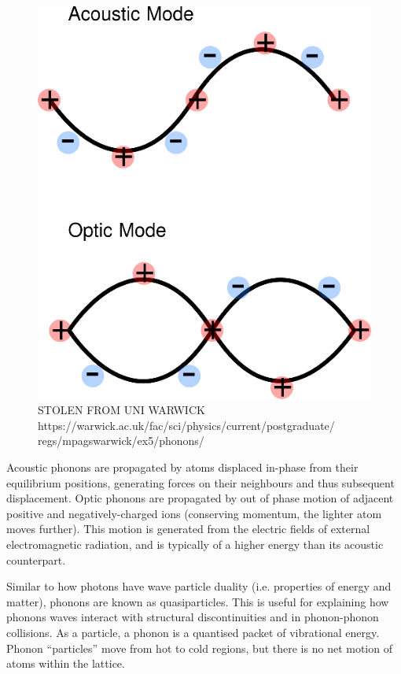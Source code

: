 \begin{figure}[h]
  \includegraphics[width=\linewidth]{Figures/phonon-warwick-acoustic-optic-diagram.png}
  \caption[PHONON TYPE DIAGRAM]{STOLEN FROM UNI WARWICK https://warwick.ac.uk/fac/sci/physics/current/postgraduate/
  regs/mpagswarwick/ex5/phonons/}
  \label{fig:phonon_diagram}
\end{figure}

Acoustic phonons are propagated by atoms displaced in-phase from their equilibrium positions, generating forces on their neighbours and thus subsequent displacement. Optic phonons are propagated by out of phase motion of adjacent positive and negatively-charged ions (conserving momentum, the lighter atom moves further). This motion is generated from the electric fields of external electromagnetic radiation, and is typically of a higher energy than its acoustic counterpart. 

Similar to how photons have wave particle duality (i.e. properties of energy and matter), phonons are known as quasiparticles. This is useful for explaining how phonons waves interact with structural discontinuities and in phonon-phonon collisions. As a particle, a phonon is a quantised packet of vibrational energy. Phonon ``particles'' move from hot to cold regions, but there is no net motion of atoms within the lattice. 

